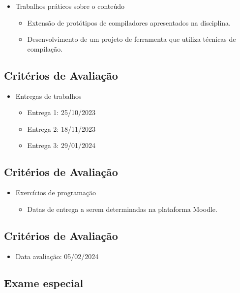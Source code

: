 \documentclass[11pt]{article}
\begin{document}
\begin{itemize}
\item Trabalhos práticos sobre o conteúdo
\begin{itemize}
\item Extensão de protótipos de compiladores apresentados na disciplina.
\item Desenvolvimento de um projeto de ferramenta que utiliza técnicas de compilação.
\end{itemize}
\end{itemize}
\subsection*{Critérios de Avaliação}
\label{sec:org0de5b08}

\begin{itemize}
\item Entregas de trabalhos
\begin{itemize}
\item Entrega 1: 25/10/2023
\item Entrega 2: 18/11/2023
\item Entrega 3: 29/01/2024
\end{itemize}
\end{itemize}
\subsection*{Critérios de Avaliação}
\label{sec:org1c77d22}

\begin{itemize}
\item Exercícios de programação
\begin{itemize}
\item Datas de entrega a serem determinadas na plataforma Moodle.
\end{itemize}
\end{itemize}
\subsection*{Critérios de Avaliação}
\label{sec:org7a72d64}

\begin{itemize}
\item Data avaliação: 05/02/2024
\end{itemize}
\subsection*{Exame especial}
\label{sec:org2c8219d}
\end{document}
